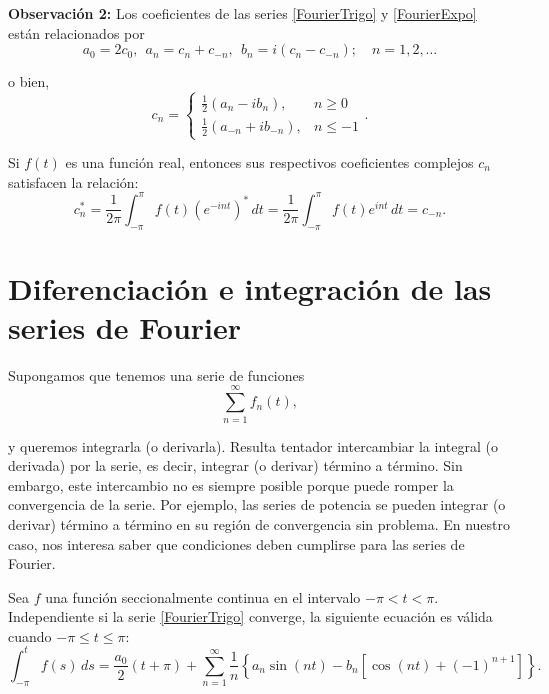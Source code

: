 \textbf{Observación 2:} Los coeficientes de las series \eqref{FourierTrigo} y \eqref{FourierExpo} están relacionados por 
\begin{equation}
a_0 = 2c_0,~~ a_n = c_n + c_{-n}, ~~ b_n = i(c_n - c_{-n}); \quad n = 1,2, \dots    \label{RelacionCoefi1}
\end{equation}

o bien, 
\begin{equation}
    c_n = \left\{ \begin{array}{cl}
        \frac{1}{2} (a_n - ib_n), & n \geq 0  \\
    \frac{1}{2}(a_{-n} + i b_{-n}),     & n  \leq -1 
    \end{array} \right. . \label{RelacionCoefi2}
\end{equation}

Si $f(t)$ es una función real, entonces sus respectivos coeficientes complejos $c_n$ satisfacen la relación:
$$c_n^* = \frac{1}{2\pi} \int_{-\pi}^{\pi} f(t) (e^{-int})^* \,dt = \frac{1}{2\pi} \int_{-\pi}^{\pi} f(t) e^{int} \,dt = c_{-n}.$$

\section{Diferenciación e integración de las series de Fourier}

Supongamos que tenemos una serie de funciones
$$\sum_{n=1}^{\infty} f_n(t),$$

y queremos integrarla (o derivarla). Resulta tentador intercambiar la integral (o derivada) por la serie, es decir, integrar (o derivar) término a término. Sin embargo, este intercambio no es siempre posible porque puede romper la convergencia de la serie. Por ejemplo, las series de potencia se pueden integrar (o derivar) término a término en su región de convergencia sin problema. En nuestro caso, nos interesa saber que condiciones deben cumplirse para las series de Fourier.

\begin{teorema}[Integración]
Sea $f$ una función seccionalmente continua en el intervalo $-\pi < t < \pi$. Independiente si la serie \eqref{FourierTrigo} converge, la siguiente ecuación es válida cuando $-\pi \leq t \leq \pi$:
\begin{equation*}
  \int_{-\pi}^t f(s) \,ds = \frac{a_0}{2} (t + \pi) + \sum_{n=1}^{\infty} \frac{1}{n} \left\{ a_n \sin(nt) - b_n[\cos(nt) + (-1)^{n+1}] \right\}.   
\end{equation*}
\end{teorema}


